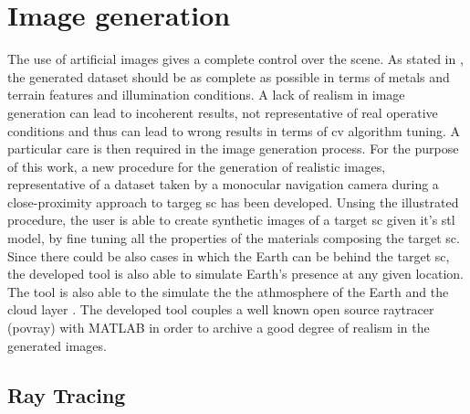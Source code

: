\section{Image generation}
The use of artificial images gives a complete control over the scene.
As stated in \cite{paolocorti}, the generated dataset should be as complete as possible in terms of metals and terrain features and illumination conditions.
A lack of realism in image generation can lead to incoherent results, not representative of real operative conditions and thus can lead to wrong results in terms of \acrshort{cv} algorithm tuning.
A particular care is then required in the image generation process.
For the purpose of this work, a new procedure for the generation of realistic images, representative of a dataset taken by a monocular navigation camera during a close-proximity approach to targeg \acrshort{sc} has been developed.
Unsing the illustrated procedure, the user is able to create synthetic images of a target \acrshort{sc} given it's \acrshort{stl} model, by fine tuning all the properties of the materials composing the target \acrshort{sc}.
Since there could be also cases in which the Earth can be behind the target \acrshort{sc}, the developed tool is also able to simulate Earth's presence at any given location. The tool is also able to the simulate the the athmosphere of the Earth and the cloud layer \cite{jacopo}.
The developed tool couples a well known open source raytracer (\acrshort{povray}) with MATLAB in order to archive a good degree of realism in the generated images.

\subsection{Ray Tracing}
